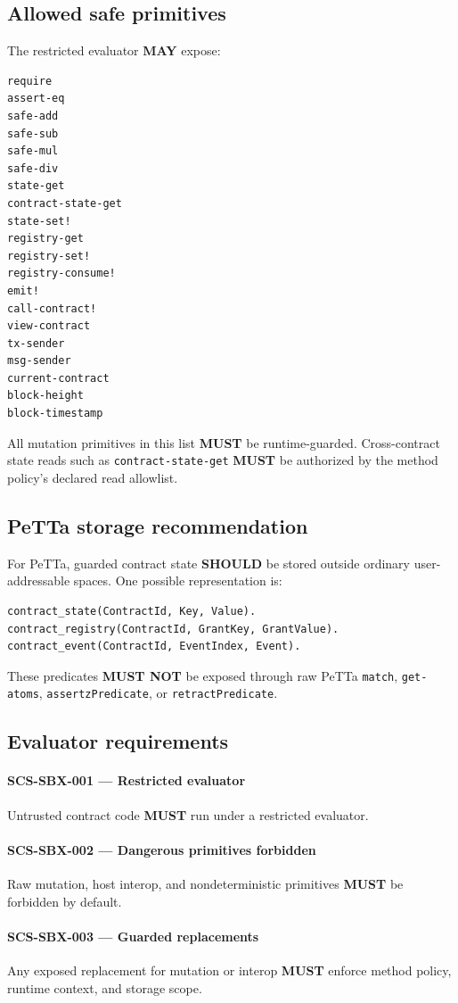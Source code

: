 \documentclass[11pt]{article}
\newcommand{\PeTTa}{PeTTa}
\newcommand{\MUST}{\textbf{MUST}}
\newcommand{\MUSTNOT}{\textbf{MUST NOT}}
\newcommand{\SHOULD}{\textbf{SHOULD}}
\newcommand{\MAY}{\textbf{MAY}}
\newcommand{\req}[2]{\paragraph{#1}#2\par}
\newcommand{\code}[1]{\texttt{#1}}
\begin{document}
\subsection{Allowed safe primitives}

The restricted evaluator \MAY{} expose:

\begin{lstlisting}
require
assert-eq
safe-add
safe-sub
safe-mul
safe-div
state-get
contract-state-get
state-set!
registry-get
registry-set!
registry-consume!
emit!
call-contract!
view-contract
tx-sender
msg-sender
current-contract
block-height
block-timestamp
\end{lstlisting}

All mutation primitives in this list \MUST{} be runtime-guarded.
Cross-contract state reads such as \code{contract-state-get} \MUST{} be
authorized by the method policy's declared read allowlist.

\subsection{PeTTa storage recommendation}

For \PeTTa{}, guarded contract state \SHOULD{} be stored outside ordinary user-addressable spaces. One possible representation is:

\begin{lstlisting}
contract_state(ContractId, Key, Value).
contract_registry(ContractId, GrantKey, GrantValue).
contract_event(ContractId, EventIndex, Event).
\end{lstlisting}

These predicates \MUSTNOT{} be exposed through raw \PeTTa{} \code{match}, \code{get-atoms}, \code{assertzPredicate}, or \code{retractPredicate}.

\subsection{Evaluator requirements}

\req{SCS-SBX-001 --- Restricted evaluator}{Untrusted contract code \MUST{} run under a restricted evaluator.}

\req{SCS-SBX-002 --- Dangerous primitives forbidden}{Raw mutation, host interop, and nondeterministic primitives \MUST{} be forbidden by default.}

\req{SCS-SBX-003 --- Guarded replacements}{Any exposed replacement for mutation or interop \MUST{} enforce method policy, runtime context, and storage scope.}
\end{document}
